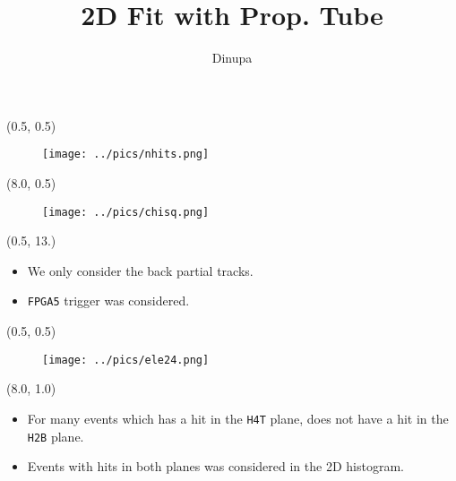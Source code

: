 \documentclass[10pt, xcolor={dvipsnames}, aspectratio = 169]{beamer}
\title{2D Fit with Prop. Tube}
\author{Dinupa}
\begin{document}
\begin{frame}
\maketitle
\end{frame}


\begin{frame}[fragile]

\begin{textblock}{7.0}(0.5, 0.5)
\begin{figure}
\centering
\texttt{[image: ../pics/nhits.png]}
\end{figure}
\end{textblock}

\begin{textblock}{7.0}(8.0, 0.5)
\begin{figure}
\centering
\texttt{[image: ../pics/chisq.png]}
\end{figure}
\end{textblock}

\begin{textblock}{10.0}(0.5, 13.)
\begin{itemize}

	\item We only consider the back partial tracks.
	\item \verb|FPGA5| trigger was considered.
\end{itemize}
\end{textblock}

\end{frame}


\begin{frame}[fragile]

\begin{textblock}{7.0}(0.5, 0.5)
\begin{figure}
\centering
\texttt{[image: ../pics/ele24.png]}
\end{figure}
\end{textblock}

\begin{textblock}{7.0}(8.0, 1.0)
\begin{itemize}
\item For many events which has a hit in the \verb|H4T| plane, does not have a hit in the \verb|H2B| plane.
\item Events with hits in both planes was considered in the 2D histogram.
\end{itemize}
\end{textblock}

\end{frame}
\end{document}
